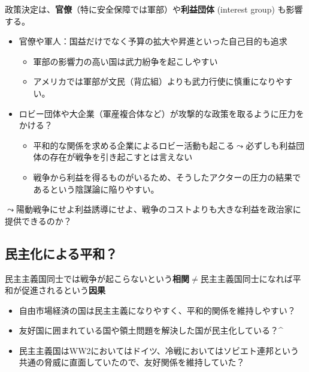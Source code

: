 \documentclass[
  xelatex,
  ja=standard]{bxjsarticle}
\providecommand{\tightlist}{%
  \setlength{\itemsep}{0pt}\setlength{\parskip}{0pt}}\usepackage{longtable,booktabs,array}
\begin{document}
政策決定は、\textbf{官僚}（特に安全保障では軍部）や\textbf{利益団体}
(interest group) も影響する。

\begin{itemize}
\tightlist
\item
  官僚や軍人：国益だけでなく予算の拡大や昇進といった自己目的も追求

  \begin{itemize}
  \tightlist
  \item
    軍部の影響力の高い国は武力紛争を起こしやすい\citep{sechser2004, weeks2012}
  \item
    アメリカでは軍部が文民（背広組）よりも武力行使に慎重になりやすい。
  \end{itemize}
\item
  ロビー団体や大企業（軍産複合体など）が攻撃的な政策を取るように圧力をかける？

  \begin{itemize}
  \tightlist
  \item
    平和的な関係を求める企業によるロビー活動も起こる\(\leadsto\)必ずしも利益団体の存在が戦争を引き起こすとは言えない\citep{brooks2013}
  \item
    戦争から利益を得るものがいるため、そうしたアクターの圧力の結果であるという陰謀論に陥りやすい。
  \end{itemize}
\end{itemize}

\(\leadsto\)陽動戦争にせよ利益誘導にせよ、戦争のコストよりも大きな利益を政治家に提供できるのか？

\hypertarget{ux6c11ux4e3bux5316ux306bux3088ux308bux5e73ux548c}{%
\subsection{民主化による平和？}\label{ux6c11ux4e3bux5316ux306bux3088ux308bux5e73ux548c}}

民主主義国同士では戦争が起こらないという\textbf{相関}\(\neq\)民主主義国同士になれば平和が促進されるという\textbf{因果}

\begin{itemize}
\tightlist
\item
  自由市場経済の国は民主主義になりやすく、平和的関係を維持しやすい？\citep{gartzke2007}
\item
  友好国に囲まれている国や領土問題を解決した国が民主化している？\citep{thompson1996, gibler2010, gibler2014}\^{}
\item
  民主主義国はWW2においてはドイツ、冷戦においてはソビエト連邦という共通の脅威に直面していたので、友好関係を維持していた？\citep{farber1997, mcdonald2015}
\end{itemize}
\end{document}
